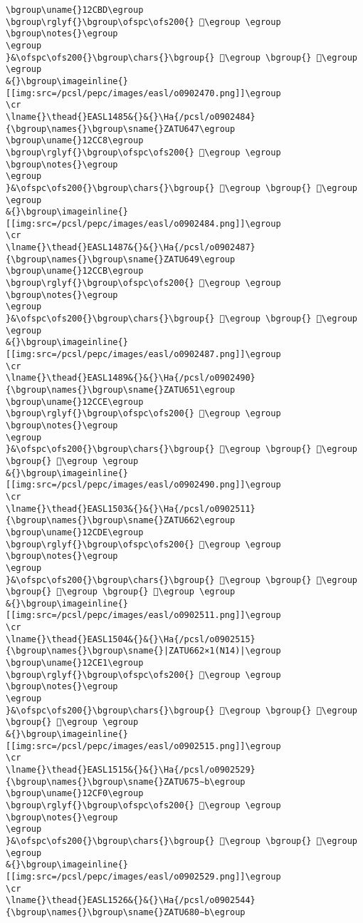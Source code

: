 \begin{verbatim}
\bgroup\uname{}12CBD\egroup
\bgroup\rglyf{}\bgroup\ofspc\ofs200{} 𒲽\egroup \egroup
\bgroup\notes{}\egroup
\egroup
}&\ofspc\ofs200{}\bgroup\chars{}\bgroup{} 𒲼\egroup \bgroup{} 𒲽\egroup \egroup
&{}\bgroup\imageinline{}[[img:src=/pcsl/pepc/images/easl/o0902470.png]]\egroup
\cr
\lname{}\thead{}EASL1485&{}&{}\Ha{/pcsl/o0902484}{\bgroup\names{}\bgroup\sname{}ZATU647\egroup
\bgroup\uname{}12CC8\egroup
\bgroup\rglyf{}\bgroup\ofspc\ofs200{} 𒳈\egroup \egroup
\bgroup\notes{}\egroup
\egroup
}&\ofspc\ofs200{}\bgroup\chars{}\bgroup{} 𒳈\egroup \bgroup{} 𒳉\egroup \egroup
&{}\bgroup\imageinline{}[[img:src=/pcsl/pepc/images/easl/o0902484.png]]\egroup
\cr
\lname{}\thead{}EASL1487&{}&{}\Ha{/pcsl/o0902487}{\bgroup\names{}\bgroup\sname{}ZATU649\egroup
\bgroup\uname{}12CCB\egroup
\bgroup\rglyf{}\bgroup\ofspc\ofs200{} 𒳋\egroup \egroup
\bgroup\notes{}\egroup
\egroup
}&\ofspc\ofs200{}\bgroup\chars{}\bgroup{} 𒳋\egroup \bgroup{} 𒳌\egroup \egroup
&{}\bgroup\imageinline{}[[img:src=/pcsl/pepc/images/easl/o0902487.png]]\egroup
\cr
\lname{}\thead{}EASL1489&{}&{}\Ha{/pcsl/o0902490}{\bgroup\names{}\bgroup\sname{}ZATU651\egroup
\bgroup\uname{}12CCE\egroup
\bgroup\rglyf{}\bgroup\ofspc\ofs200{} 𒳎\egroup \egroup
\bgroup\notes{}\egroup
\egroup
}&\ofspc\ofs200{}\bgroup\chars{}\bgroup{} 𒳘\egroup \bgroup{} 𒳗\egroup \bgroup{} 𒳎\egroup \egroup
&{}\bgroup\imageinline{}[[img:src=/pcsl/pepc/images/easl/o0902490.png]]\egroup
\cr
\lname{}\thead{}EASL1503&{}&{}\Ha{/pcsl/o0902511}{\bgroup\names{}\bgroup\sname{}ZATU662\egroup
\bgroup\uname{}12CDE\egroup
\bgroup\rglyf{}\bgroup\ofspc\ofs200{} 𒳞\egroup \egroup
\bgroup\notes{}\egroup
\egroup
}&\ofspc\ofs200{}\bgroup\chars{}\bgroup{} 𒳤\egroup \bgroup{} 𒳠\egroup \bgroup{} 𒳞\egroup \bgroup{} 𒳢\egroup \egroup
&{}\bgroup\imageinline{}[[img:src=/pcsl/pepc/images/easl/o0902511.png]]\egroup
\cr
\lname{}\thead{}EASL1504&{}&{}\Ha{/pcsl/o0902515}{\bgroup\names{}\bgroup\sname{}|ZATU662×1(N14)|\egroup
\bgroup\uname{}12CE1\egroup
\bgroup\rglyf{}\bgroup\ofspc\ofs200{} 𒳡\egroup \egroup
\bgroup\notes{}\egroup
\egroup
}&\ofspc\ofs200{}\bgroup\chars{}\bgroup{} 𒳡\egroup \bgroup{} 𒳟\egroup \bgroup{} 𒳣\egroup \egroup
&{}\bgroup\imageinline{}[[img:src=/pcsl/pepc/images/easl/o0902515.png]]\egroup
\cr
\lname{}\thead{}EASL1515&{}&{}\Ha{/pcsl/o0902529}{\bgroup\names{}\bgroup\sname{}ZATU675∼b\egroup
\bgroup\uname{}12CF0\egroup
\bgroup\rglyf{}\bgroup\ofspc\ofs200{} 𒳰\egroup \egroup
\bgroup\notes{}\egroup
\egroup
}&\ofspc\ofs200{}\bgroup\chars{}\bgroup{} 𒳯\egroup \bgroup{} 𒳰\egroup \egroup
&{}\bgroup\imageinline{}[[img:src=/pcsl/pepc/images/easl/o0902529.png]]\egroup
\cr
\lname{}\thead{}EASL1526&{}&{}\Ha{/pcsl/o0902544}{\bgroup\names{}\bgroup\sname{}ZATU680∼b\egroup

\end{verbatim}

